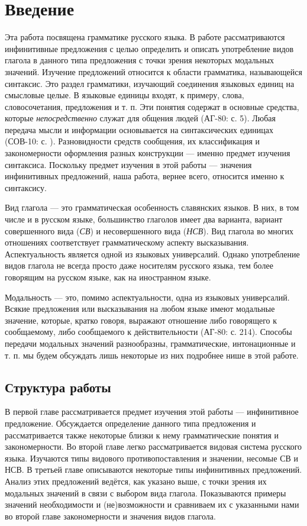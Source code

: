 \section{Введение}
Эта работа посвящена грамматике русского языка. В работе рассматриваются инфинитивные предложения с целью определить и описать употребление видов глагола в данного типа предложения с точки зрения некоторых модальных значений. Изучение предложений относится к области грамматика, называющейся синтаксис. Это раздел грамматики, изучающий соединения языковых единиц на смысловые целые. В языковые единицы входят, к примеру, слова, словосочетания, предложения и т. п. Эти понятия содержат в основные средства, которые \textit{непосредственно} служат для общения людей (АГ-80: с. 5). Любая передача мысли и информации основывается на синтаксических единицах (СОВ-10: с. ). Разновидности средств сообщения, их классификация и закономерности оформления разных конструкции --- именно предмет изучения синтаксиса. Поскольку предмет изучения в этой работы --- значения инфинитивных предложений, наша работа, вернее всего, относится именно к синтаксису.

Вид глагола --- это грамматическая особенность славянских языков. В них, в том числе и в русском языке, большинство глаголов имеет два варианта, вариант совершенного вида (\textit{СВ}) и несовершенного вида (\textit{НСВ}). Вид глагола во многих отношениях соответствует грамматическому аспекту высказывания. Аспектуальность является одной из языковых универсалий. Однако употребление видов глагола не всегда просто даже носителям русского языка, тем более говорящим на русском языке, как на иностранном языке.

Модальность --- это, помимо аспектуальности, одна из языковых универсалий. Всякие предложения или высказывания на любом языке имеют модальные значение, которые, кратко говоря, выражают отношение либо говорящего к сообщаемому, либо сообщаемого к действительности (АГ-80: с. 214). Способы передачи модальных значений разнообразны, грамматические, интонационные и т. п. мы будем обсуждать лишь некоторые из них подробнее нише в этой работе.

\subsection*{Структура работы}

В первой главе рассматривается предмет изучения этой работы --- инфинитивное предложение. Обсуждается определение данного типа предложения и рассматривается также некоторые близки к нему грамматические понятия и закономерности. Во второй главе легко рассматривается видовая система русского языка. Изучаются типы видового противопоставления и значении, несомые СВ и НСВ. В третьей главе описываются некоторые типы инфинитивных предложений.  Анализ этих предложений ведётся, как указано выше, с точки зрения их модальных значений в связи с выбором вида глагола. Показываются примеры значений необходимости и (не)возможности и сравниваем их с указанными нами во второй главе закономерности и значения видов глагола.